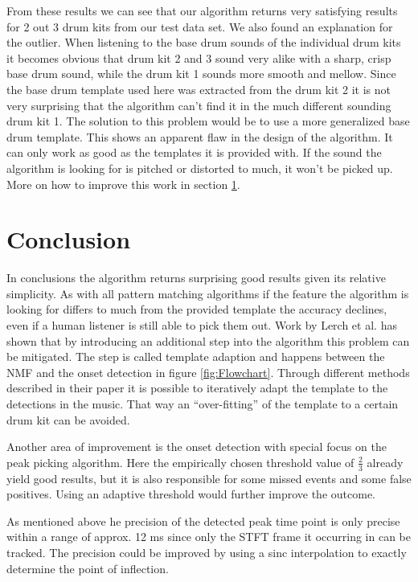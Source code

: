 \documentclass{article}
\begin{document}
From these results we can see that our algorithm returns very satisfying results for 2 out 3 drum kits from our test data set.
We also found an explanation for the outlier.
When listening to the base drum sounds of the individual drum kits it becomes obvious that drum kit 2 and 3 sound very alike with a sharp, crisp base drum sound, while the drum kit 1 sounds more smooth and mellow.
Since the base drum template used here was extracted from the drum kit 2 it is not very surprising that the algorithm can't find it in the much different sounding drum kit 1.
The solution to this problem would be to use a more generalized base drum template.
This shows an apparent flaw in the design of the algorithm.
It can only work as good as the templates it is provided with.
If the sound the algorithm is looking for is pitched or distorted to much, it won't be picked up.
More on how to improve this work in section \ref{sec:conclusion}.






\section{Conclusion}
\label{sec:conclusion}

In conclusions the algorithm returns surprising good results given its relative simplicity.
As with all pattern matching algorithms if the feature the algorithm is looking for differs to much from the provided template the accuracy declines, even if a human listener is still able to pick them out.
Work by Lerch et al. \cite{lerch2015} has shown that by introducing an additional step into the algorithm this problem can be mitigated.
The step is called template adaption and happens between the NMF and the onset detection in figure \ref{fig:Flowchart}.
Through different methods described in their paper it is possible to iteratively adapt the template to the detections in the music.
That way an ``over-fitting'' of the template to a certain drum kit can be avoided.

Another area of improvement is the onset detection with special focus on the peak picking algorithm.
Here the empirically chosen threshold value of $\frac{2}{3}$ already yield good results, but it is also responsible for some missed events and some false positives.
Using an adaptive threshold would further improve the outcome.

As mentioned above he precision of the detected peak time point is only precise within a range of approx. 12 ms since only the STFT frame it occurring in can be tracked.
The precision could be improved by using a sinc interpolation to exactly determine the point of inflection.
\end{document}
